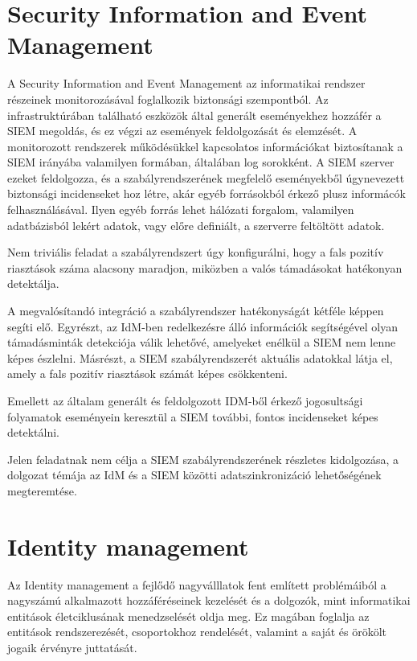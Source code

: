 \section{Security Information and Event Management}

A Security Information and Event Management az informatikai rendszer részeinek monitorozásával foglalkozik biztonsági szempontból. Az infrastruktúrában található eszközök által generált eseményekhez hozzáfér a SIEM megoldás, és ez végzi az események feldolgozását és elemzését. A monitorozott rendszerek működésükkel kapcsolatos információkat biztosítanak a SIEM irányába valamilyen formában, általában log sorokként. A SIEM szerver ezeket feldolgozza, és a szabályrendszerének megfelelő eseményekből úgynevezett biztonsági incidenseket hoz létre, akár egyéb forrásokból érkező plusz informácók felhasználásával. Ilyen egyéb forrás lehet hálózati forgalom, valamilyen adatbázisból lekért adatok, vagy előre definiált, a szerverre feltöltött adatok. 

Nem triviális feladat a szabályrendszert úgy konfigurálni, hogy a fals pozitív riasztások száma alacsony maradjon, miközben a valós támadásokat hatékonyan detektálja. 

A megvalósítandó integráció a szabályrendszer hatékonyságát kétféle képpen segíti elő. Egyrészt, az IdM-ben redelkezésre álló információk segítségével olyan támadásminták detekciója válik lehetővé, amelyeket enélkül a SIEM nem lenne képes észlelni. Másrészt, a SIEM szabályrendszerét aktuális adatokkal látja el, amely a fals pozitív riasztások számát képes csökkenteni.

Emellett az általam generált és feldolgozott IDM-ből érkező jogosultsági folyamatok eseményein keresztül a SIEM további, fontos incidenseket képes detektálni.

Jelen feladatnak nem célja a SIEM szabályrendszerének részletes kidolgozása, a dolgozat témája az IdM és a SIEM közötti adatszinkronizáció lehetőségének megteremtése.

\section{Identity management}

Az Identity management a fejlődő nagyválllatok fent említett problémáiból a nagyszámú alkalmazott hozzáféréseinek kezelését és a dolgozók, mint informatikai entitások életciklusának menedzselését oldja meg. Ez magában foglalja az entitások  rendszerezését, csoportokhoz rendelését, valamint a saját és örökölt jogaik érvényre juttatását.

